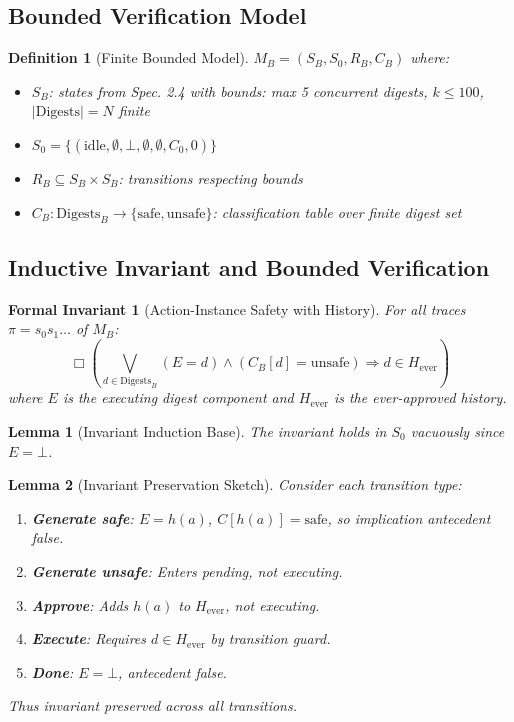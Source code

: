 \documentclass[12pt]{article}
\newtheorem{definition}{Definition}[section]
\newtheorem{invariant}{Formal Invariant}[section]
\newtheorem{lemma}{Lemma}[section]
\begin{document}
\subsection{Bounded Verification Model}

\begin{definition}[Finite Bounded Model]
$M_B = (S_B, S_0, R_B, C_B)$ where:
\begin{itemize}
    \item $S_B$: states from Spec. 2.4 with bounds: max 5 concurrent digests, $k \leq 100$, $|\mathrm{Digests}| = N$ finite
    \item $S_0 = \{(\text{idle}, \emptyset, \bot, \emptyset, \emptyset, C_0, 0)\}$
    \item $R_B \subseteq S_B \times S_B$: transitions respecting bounds
    \item $C_B: \mathrm{Digests}_B \to \{\text{safe}, \text{unsafe}\}$: classification table over finite digest set
\end{itemize}
\end{definition}

\subsection{Inductive Invariant and Bounded Verification}

\begin{invariant}[Action-Instance Safety with History]
For all traces $\pi = s_0 s_1 \dots$ of $M_B$:
\[
\Box\left(\bigvee_{d \in \mathrm{Digests}_B} (E = d) \land (C_B[d] = \text{unsafe}) \Rightarrow d \in H_{\text{ever}}\right)
\]
where $E$ is the executing digest component and $H_{\text{ever}}$ is the ever-approved history.
\end{invariant}

\begin{lemma}[Invariant Induction Base]
The invariant holds in $S_0$ vacuously since $E = \bot$.
\end{lemma}

\begin{lemma}[Invariant Preservation Sketch]
Consider each transition type:
\begin{enumerate}
    \item \textbf{Generate safe}: $E = h(a)$, $C[h(a)] = \text{safe}$, so implication antecedent false.
    \item \textbf{Generate unsafe}: Enters pending, not executing.
    \item \textbf{Approve}: Adds $h(a)$ to $H_{\text{ever}}$, not executing.
    \item \textbf{Execute}: Requires $d \in H_{\text{ever}}$ by transition guard.
    \item \textbf{Done}: $E = \bot$, antecedent false.
\end{enumerate}
Thus invariant preserved across all transitions.
\end{lemma}
\end{document}
